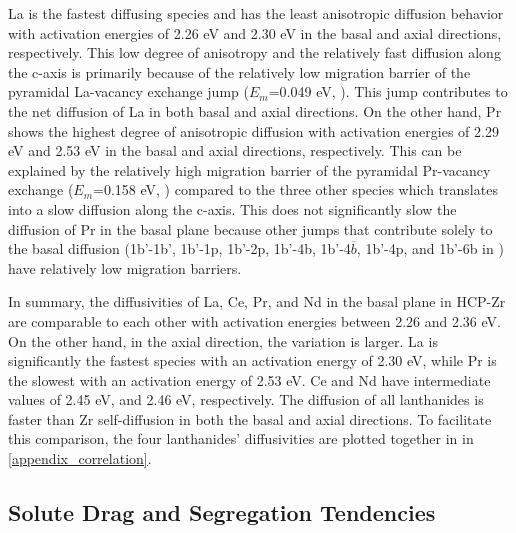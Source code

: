 \documentclass[preprint,12pt]{elsarticle}
\begin{document}
\FloatBarrier
La is the fastest diffusing species and has the least anisotropic diffusion behavior with activation energies of 2.26 eV and 2.30 eV in the basal and axial directions, respectively. This low degree of anisotropy and the relatively fast diffusion along the c-axis is primarily because of the relatively low migration barrier of the pyramidal La-vacancy exchange jump ($E_m$=0.049 eV, ). This jump contributes to the net diffusion of La in both basal and axial directions. On the other hand, Pr shows the highest degree of anisotropic diffusion with activation energies of 2.29 eV and 2.53 eV in the basal and axial directions, respectively. This can be explained by the relatively high migration barrier of the pyramidal Pr-vacancy exchange ($E_m$=0.158 eV, ) compared to the three other species which translates into a slow diffusion along the c-axis. This does not significantly slow the diffusion of Pr in the basal plane because other jumps that contribute solely to the basal diffusion (1b'-1b', 1b'-1p, 1b'-2p, 1b'-4b, 1b'-4$\overline{b}$, 1b'-4p, and 1b'-6b in ) have relatively low migration barriers.

In summary, the diffusivities of La, Ce, Pr, and Nd in the basal plane in HCP-Zr are comparable to each other with activation energies between 2.26 and 2.36 eV. On the other hand, in the axial direction, the variation is larger. La is significantly the fastest species with an activation energy of 2.30 eV, while Pr is the slowest with an activation energy of 2.53 eV. Ce and Nd have intermediate values of 2.45 eV, and 2.46 eV, respectively. The diffusion of all lanthanides is faster than Zr self-diffusion in both the basal and axial directions. To facilitate this comparison, the four lanthanides' diffusivities are plotted together in  in \ref{appendix_correlation}.

\FloatBarrier

\subsection{Solute Drag and Segregation Tendencies}
\label{subsection_drag}
\end{document}
